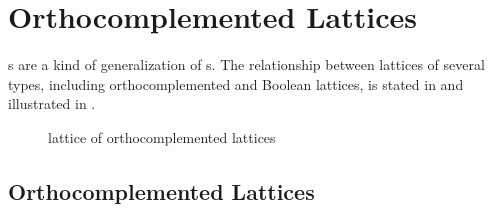 ﻿%


\chapter{Orthocomplemented Lattices}
s  are a kind of generalization of s.
The relationship between lattices of several types, including orthocomplemented and Boolean lattices,
is stated in  and illustrated in .

\begin{figure}[th]
  \begin{center}
    {}
  \end{center}
  \caption{lattice of orthocomplemented lattices\label{fig:latortholat}}
\end{figure}
\section{Orthocomplemented Lattices}
